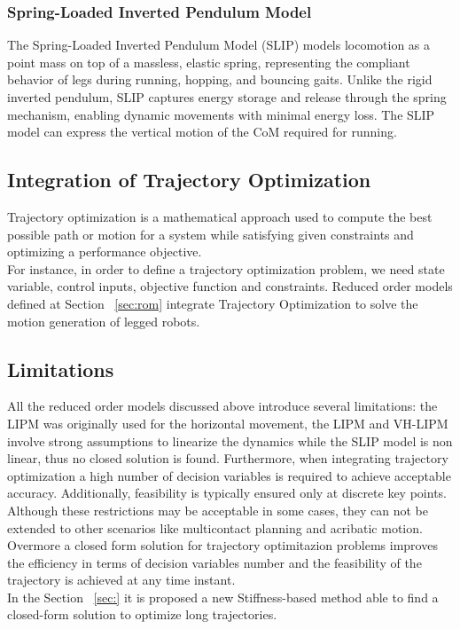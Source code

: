 \documentclass[main.tex]{subfiles}
\begin{document}
\subsubsection{Spring-Loaded Inverted Pendulum Model}
The Spring-Loaded Inverted Pendulum Model (SLIP) \cite{SLIP} models locomotion as a point mass on top of a massless, elastic spring, representing the compliant behavior of legs during running, hopping, and bouncing gaits. Unlike the rigid inverted pendulum, SLIP captures energy storage and release through the spring mechanism, enabling dynamic movements with minimal energy loss.
The SLIP model can express the vertical motion of the CoM required for running.

\subsection{Integration of Trajectory Optimization}

Trajectory optimization is a mathematical approach used to compute the best possible path or motion for a system while satisfying given constraints and optimizing a performance objective.
\\For instance, in order to define a trajectory optimization problem, we need state variable, control inputs, objective function and constraints.
Reduced order models defined at Section ~\ref{sec:rom} integrate Trajectory Optimization to solve the motion generation of legged robots.


\subsection{Limitations}
All the reduced order models discussed above introduce several limitations: 
the LIPM was originally used for the horizontal movement, the LIPM and VH-LIPM involve strong assumptions to linearize the dynamics while the SLIP model is non linear, thus no closed solution is found. 
Furthermore, when integrating trajectory optimization a high number of decision variables is required to achieve acceptable accuracy. Additionally, feasibility is typically ensured only at discrete key points.
Although these restrictions may be acceptable in some cases, they can not be extended to other scenarios like multicontact planning and acribatic motion. Overmore a closed form solution for trajectory optimitazion problems improves the efficiency in terms of decision variables number and the feasibility of the trajectory is achieved at any time instant.
\\In the Section ~\ref{sec:} it is proposed a new Stiffness-based method able to find a closed-form solution to optimize long trajectories.
\end{document}
